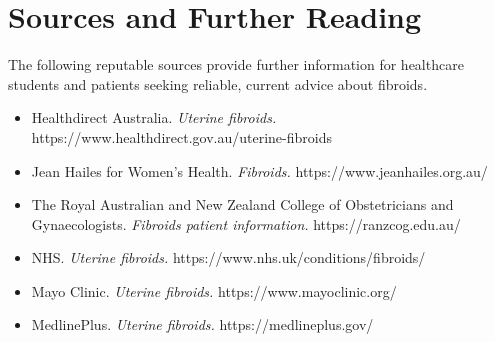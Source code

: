 \section*{Sources and Further Reading}
The following reputable sources provide further information for healthcare students and patients seeking reliable, current advice about fibroids.
\begin{itemize}
    \item Healthdirect Australia. \textit{Uterine fibroids.} https://www.healthdirect.gov.au/uterine-fibroids
    \item Jean Hailes for Women's Health. \textit{Fibroids.} https://www.jeanhailes.org.au/
    \item The Royal Australian and New Zealand College of Obstetricians and Gynaecologists. \textit{Fibroids patient information.} https://ranzcog.edu.au/
    \item NHS. \textit{Uterine fibroids.} https://www.nhs.uk/conditions/fibroids/
    \item Mayo Clinic. \textit{Uterine fibroids.} https://www.mayoclinic.org/
    \item MedlinePlus. \textit{Uterine fibroids.} https://medlineplus.gov/
\end{itemize}

